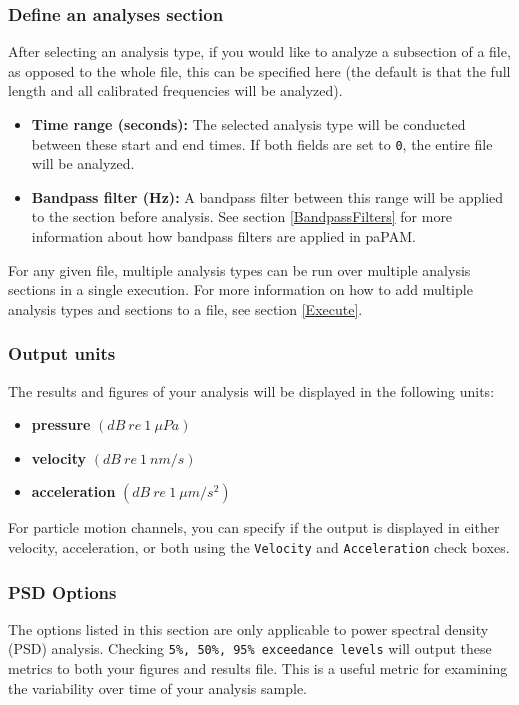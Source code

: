 \documentclass[11pt]{report}
\begin{document}
\subsubsection{Define an analyses section}
After selecting an analysis type, if you would like to analyze a subsection of a file, as opposed to the whole file, this can be specified here (the default is that the full length and all calibrated frequencies will be analyzed). 

\begin{itemize}
\item \textbf{Time range (seconds):}  The selected analysis type will be conducted between these start and end times.  If both fields are set to \texttt{0}, the entire file will be analyzed.
\item \textbf{Bandpass filter (Hz):}  A bandpass filter between this range will be applied to the section before analysis.  See section \ref{BandpassFilters} for more information about how bandpass filters are applied in paPAM.
\end{itemize}

For any given file, multiple analysis types can be run over multiple analysis sections in a single execution.  For more information on how to add multiple analysis types and sections to a file, see section \ref{Execute}. 

\subsubsection{Output units}

The results and figures of your analysis will be displayed in the following units:
\begin{itemize}
\item \textbf{pressure} $(\mathit{dB\ re\ 1 \  \mu Pa})$ 
\item \textbf{velocity} $(\mathit{dB\ re\ 1 \ nm/s})$
\item \textbf{acceleration} $(\mathit{dB\ re\ 1\ \mu m/s^2})$
\end{itemize} 

For particle motion channels, you can specify if the output is displayed in either velocity, acceleration, or both using the \texttt{Velocity} and \texttt{Acceleration} check boxes.

\subsubsection{PSD Options}
The options listed in this section are only applicable to power spectral density (PSD) analysis.  Checking \texttt{5\%, 50\%, 95\% exceedance levels} will output these metrics to both your figures and results file.  This is a useful metric for examining the variability over time of your analysis sample.  
\end{document}
